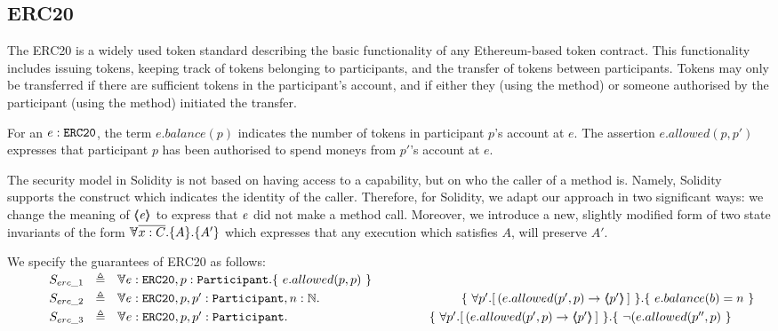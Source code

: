 \subsection{ERC20}

The ERC20 \cite{ERC20} is a widely used token standard describing the basic functionality of any Ethereum-based token 
contract. 
This functionality includes issuing tokens, keeping track of tokens belonging to participants, and the 
transfer of tokens between participants. Tokens may only be transferred if there are sufficient tokens in the 
participant's account, and if either they (using the  method) or someone authorised by the participant (using the  method) initiated the transfer. 

For an $e:\mbox{\normalfont{\texttt{ERC20}}}$, the term $e.balance(p)$  indicates the number of tokens in   participant $p$'s  account at $e$.
The 
assertion $e.allowed(p,p')$ expresses that participant $p$ has been authorised to spend moneys from $p'$'s account at $e$.
 
The security model in Solidity is not based on having access to a capability, but on who the caller of a method is. 
Namely, Solidity supports the  construct  which indicates the identity of the caller.
Therefore, for Solidity, we adapt our approach in two significant ways:
we change the meaning of $\langle\!\!\langle \mathit{e} \rangle\!\!\rangle$ to express that $\mathit{e}$ did not make a method call.
Moreover, we introduce a new, slightly modified form of two state invariants of the form $\TwoStates{\overline {x:C}}{A}{A'}$ which expresses that any execution which satisfies $A$, will preserve $A'$.


We specify the guarantees of   ERC20  as follows:
\\
$\strut \SPSP  S_{erc\_1}\ \  \triangleq \ \ \TwoStatesN{ e:\prg{ERC20},p:\prg{Participant}}  {\  e.allowed(p,p)   \ } $ 
\\
$\strut \SPSP  S_{erc\_2}\ \  \triangleq \ \ \TwoStatesLB{ e:\prg{ERC20},p,p':\prg{Participant},n:\mathbb{N}} 
 {\ \forall p'.[\,(e.allowed(p',p) \rightarrow   \inside{p'}\, ] \ } { \ e.balance(b)=n \ } $ 
\\
$\strut \SPSP  S_{erc\_3}\ \  \triangleq \ \ \TwoStatesLB{ e:\prg{ERC20},p,p':\prg{Participant}}  {\ \forall p'.[\,(e.allowed(p',p) \rightarrow   \inside{p'}\, ] \ } { \ \neg (e.allowed(p'',p) \ } $ 

